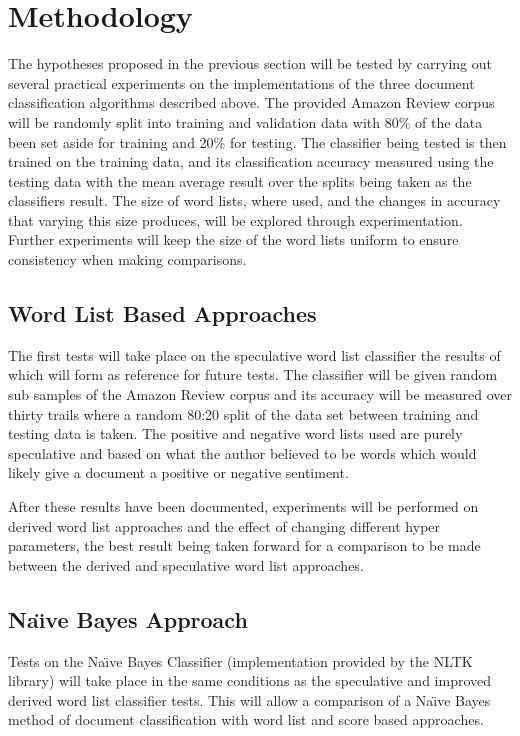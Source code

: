 \documentclass{llncs}
\begin{document}
\section{Methodology}

The hypotheses proposed in the previous section will be tested by carrying out several practical experiments on the implementations of the three document classification algorithms described above. The provided Amazon Review corpus will be randomly split into training and validation data with 80\% of the data been set aside for training and 20\% for testing. The classifier being tested is then trained on the training data, and its classification accuracy measured using the testing data with the mean average result over the splits being taken as the classifiers result. The size of word lists, where used, and the changes in accuracy that varying this size produces, will be explored through experimentation. Further experiments will keep the size of the word lists uniform to ensure consistency when making comparisons.

\subsection{Word List Based Approaches}
The first tests will take place on the speculative word list classifier the results of which will form as reference for future tests. The classifier will be given random sub samples of the Amazon Review corpus and its accuracy will be measured over thirty trails where a random 80:20 split of the data set between training and testing data is taken. The positive and negative word lists used are purely speculative and based on what the author believed to be words which would likely give a document a positive or negative sentiment.

After these results have been documented, experiments will be performed on derived word list approaches and the effect of changing different hyper parameters, the best result being taken forward for a comparison to be made between the derived and speculative word list approaches.

\subsection{Na\"\i ve Bayes Approach}
Tests on the Na\"\i ve Bayes Classifier (implementation provided by the NLTK library) will take place in the same conditions as the speculative and improved derived word list classifier tests. This will allow a comparison of a Na\"\i ve Bayes method of document classification with word list and score based approaches.
\end{document}
